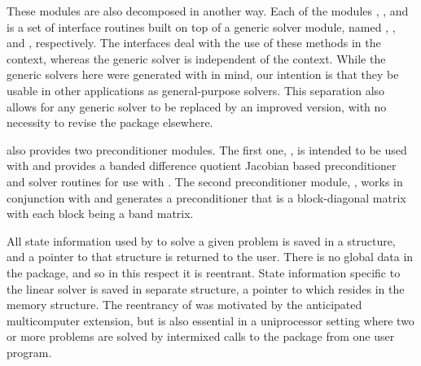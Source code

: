 These modules are also decomposed in another way.
Each of the modules {\cvdense}, {\cvband}, and {\cvspgmr} is a set of 
interface routines built on top of a generic solver module, 
named {\dense}, {\band}, and {\spgmr}, respectively.  
The interfaces deal with the use of these methods in the {\cvode} context, 
whereas the generic solver is independent of the context.
While the generic solvers here were generated with {\sundials} in mind, our
intention is that they be usable in other applications as
general-purpose solvers.  This separation also allows for any generic
solver to be replaced by an improved version, with no necessity to
revise the {\cvode} package elsewhere.

{\cvode} also provides two preconditioner modules. The first one, 
{\cvbandpre}, is intended to be used with {\nvecs} and provides
a banded difference quotient Jacobian based preconditioner and solver
routines for use with {\cvspgmr}. The second preconditioner module, 
{\cvbbdpre}, works in conjunction with {\nvecp} and generates a 
preconditioner that is a block-diagonal matrix with each block being 
a band matrix.

All state information used by {\cvode} to solve a given problem is saved
in a structure, and a pointer to that structure is returned to the
user.  There is no global data in the {\cvode} package, and so in this
respect it is reentrant. State information specific to the linear
solver is saved in separate structure, a pointer to which resides in
the {\cvode} memory structure. The reentrancy of {\cvode} was motivated
by the anticipated multicomputer extension, but is also essential
in a uniprocessor setting where two or more problems are solved by
intermixed calls to the package from one user program.

